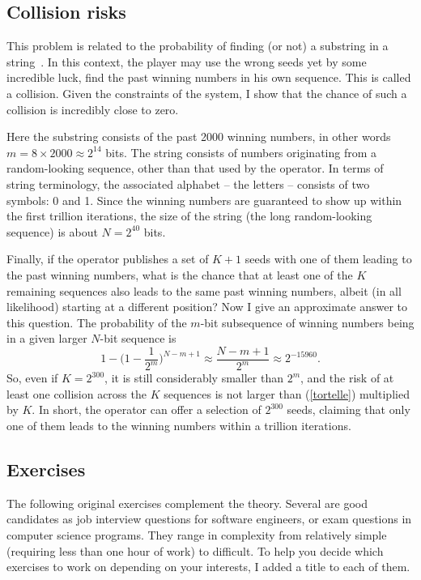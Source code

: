 \documentclass[oneside,10pt]{book}
\begin{document}
\subsection{Collision risks}\label{uitres}


This problem is related to the probability of finding (or not) a substring in a string~\cite{noonan99}. In this context, the player may use the wrong  seeds yet by some incredible luck, find the past winning numbers in his own sequence. This is called a collision. Given the constraints of the system, I show that the chance of such a collision is incredibly close to zero.

Here the substring consists of the past 2000 winning numbers, in other words $m=8\times 2000 \approx 2^{14}$ bits.
The string consists of numbers originating from a random-looking sequence, other than that used by the operator. In terms of string terminology, the associated alphabet -- the letters -- consists of two symbols: 0 and 1.
Since the winning numbers are guaranteed to show up within the first trillion iterations, the size of the string (the long random-looking sequence) is about $N=2^{40}$ bits.

Finally, if the operator publishes a set of $K + 1$ seeds with one of them leading to the past winning numbers, what is the chance that at least one of the $K$ remaining sequences also leads to the same past winning numbers, albeit (in all likelihood) starting at a different position?
Now I give an approximate answer to this question. The probability of the $m$-bit subsequence of winning numbers being in a given larger $N$-bit sequence is
\begin{equation}
1- \Big(1- \frac{1}{2^m}\Big)^{N-m+1} \approx \frac{N-m+1}{2^m} \approx 2^{-15960}.\label{tortelle}
\end{equation}
So, even if $K=2^{300}$, it is still considerably smaller than $2^m$, and the risk of at least one collision across the $K$ sequences is
  not larger than (\ref{tortelle}) multiplied by $K$. In short, the operator can offer a selection of $2^{300}$ seeds, claiming
 that only one of them leads to the winning numbers within a trillion iterations.


\subsection{Exercises}

The following original exercises complement the theory. Several are good candidates as job interview questions for
 software engineers, or exam questions in computer science programs. They range in complexity from relatively simple (requiring less than one hour of work) to difficult. To help
 you decide which exercises to work on depending on your interests, I added a title to each of them.
\end{document}
